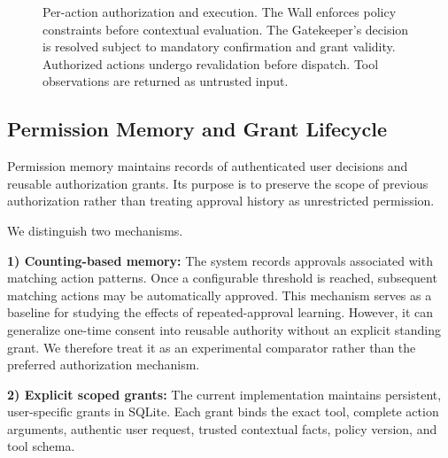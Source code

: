 \documentclass[10pt,conference]{IEEEtran}
\begin{document}
\begin{figure}[!t]
{%
}
\caption{Per-action authorization and execution.
The Wall enforces policy constraints before contextual
evaluation. The Gatekeeper's decision is resolved
subject to mandatory confirmation and grant validity.
Authorized actions undergo revalidation before dispatch.
Tool observations are returned as untrusted input.}
\label{fig:runtime}
\end{figure}


\subsection{Permission Memory and Grant Lifecycle}

Permission memory maintains records of authenticated user decisions and reusable authorization grants. Its purpose is to preserve the scope of previous authorization rather than treating approval history as unrestricted permission.

We distinguish two mechanisms.

\textbf{1) Counting-based memory:}
The system records approvals associated with matching action patterns. Once a configurable threshold is reached, subsequent matching actions may be automatically approved. This mechanism serves as a baseline for studying the effects of repeated-approval learning. However, it can generalize one-time consent into reusable authority without an explicit standing grant. We therefore treat it as an experimental comparator rather than the preferred authorization mechanism.

\textbf{2) Explicit scoped grants:}
The current implementation maintains persistent,
user-specific grants in SQLite. Each grant binds
the exact tool, complete action arguments,
authentic user request, trusted contextual
facts, policy version, and tool schema.
\end{document}
